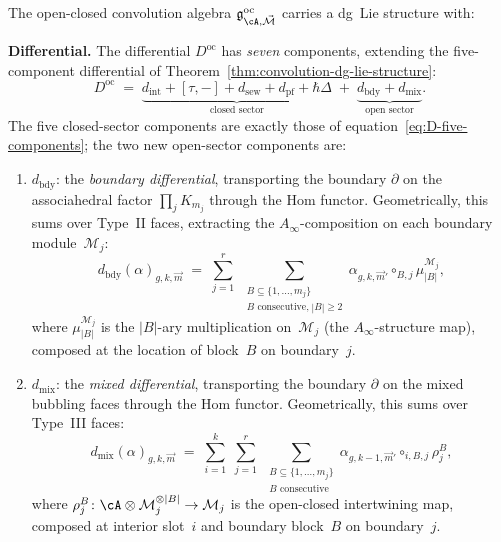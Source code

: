 \begin{theorem}
\label{thm:oc-convolution-dg-lie}
The open-closed convolution algebra
$\mathfrak{g}^{\mathrm{oc}}_{\cA, \vec{\mathcal{M}}}$ carries
a dg~Lie structure with:

\noindent\textbf{Differential.}
The differential $D^{\mathrm{oc}}$ has \emph{seven} components,
extending the five-component differential of
Theorem~\textup{\ref{thm:convolution-dg-lie-structure}}:
\begin{equation}\label{eq:Doc-seven}
D^{\mathrm{oc}}
\;=\;
\underbrace{d_{\mathrm{int}}
+ [\tau,-]
+ d_{\mathrm{sew}}
+ d_{\mathrm{pf}}
+ \hbar\Delta}_{\text{closed sector}}
\;+\;
\underbrace{d_{\mathrm{bdy}}
+ d_{\mathrm{mix}}}_{\text{open sector}}.
\end{equation}
The five closed-sector components are exactly those of
equation~\eqref{eq:D-five-components}; the two new open-sector
components are:
\begin{enumerate}[label=\textup{(\alph*)}]
\item $d_{\mathrm{bdy}}$: the \emph{boundary differential},
 transporting the boundary $\partial$ on the associahedral factor
 $\prod_j K_{m_j}$ through the Hom functor. Geometrically, this
 sums over Type~II faces, extracting the $A_\infty$-composition
 on each boundary module~$\mathcal{M}_j$:
 \begin{equation}\label{eq:d-bdy}
 d_{\mathrm{bdy}}(\alpha)_{g, k, \vec{m}}
 \;=\;
 \sum_{j=1}^r \;
 \sum_{\substack{B \subseteq \{1, \ldots, m_j\} \\
 B \text{ consecutive,}\; |B| \geq 2}}
 \alpha_{g, k, \vec{m}'} \circ_{B,j}
 \mu_{|B|}^{\mathcal{M}_j},
 \end{equation}
 where $\mu_{|B|}^{\mathcal{M}_j}$ is the $|B|$-ary
 multiplication on~$\mathcal{M}_j$ (the $A_\infty$-structure
 map), composed at the location of block~$B$ on boundary~$j$.
\item $d_{\mathrm{mix}}$: the \emph{mixed differential},
 transporting the boundary $\partial$ on the mixed bubbling faces
 through the Hom functor. Geometrically, this sums over
 Type~III faces:
 \begin{equation}\label{eq:d-mix}
 d_{\mathrm{mix}}(\alpha)_{g, k, \vec{m}}
 \;=\;
 \sum_{i=1}^{k}\;
 \sum_{j=1}^{r}\;
 \sum_{\substack{B \subseteq \{1,\ldots,m_j\} \\
 B \text{ consecutive}}}
 \alpha_{g, k-1, \vec{m}'} \circ_{i,B,j}
 \rho_j^B,
 \end{equation}
 where $\rho_j^B \colon \cA \otimes \mathcal{M}_j^{\otimes |B|}
 \to \mathcal{M}_j$ is the open-closed intertwining map, composed
 at interior slot~$i$ and boundary block~$B$ on boundary~$j$.
\end{enumerate}


\end{theorem}
